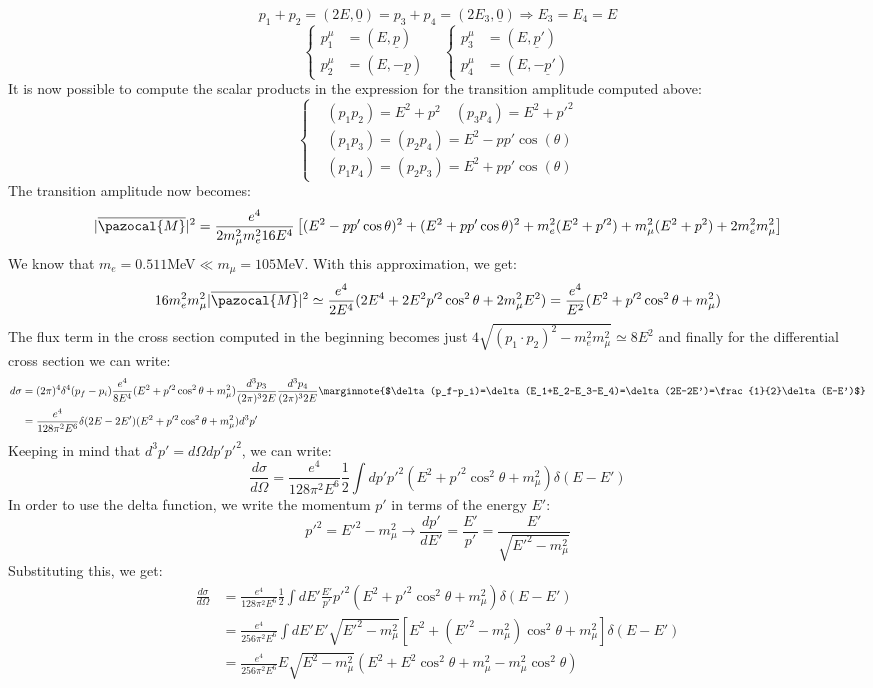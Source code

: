 \documentclass[../main.tex]{subfiles}
\begin{document}
\[
p_1+p_2=(2E,\underline{0})=p_3+p_4=(2E_3,\underline{0})\Rightarrow E_3=E_4=E
\]
\[
\left\{
\begin{aligned}
p_1^\mu&=(E,\underline{p})\\
p_2^\mu&=(E,-\underline{p})
\end{aligned}
\right.
\quad
\left\{
\begin{aligned}
p_3^\mu&=(E,\underline{p}')\\
p_4^\mu&=(E,-\underline{p}')
\end{aligned}
\right.
\]
It is now possible to compute the scalar products in the expression for the transition amplitude computed above:
\[
\left\{
\begin{aligned}
&(p_1p_2)=E^2+p^2 \quad (p_3p_4)=E^2+p'^2\\
&(p_1p_3)=(p_2p_4)=E^2-pp'\cos(\theta)\\
&(p_1p_4)=(p_2p_3)=E^2+pp'\cos(\theta)
\end{aligned}
\right.
\]
The transition amplitude now becomes:
\[
|\overline{\pazocal{M}}|^2=\frac{e^4}{2m_\mu^2m_e^216E^4}\left[(E^2-pp'\cos\theta)^2+(E^2+pp'\cos\theta)^2+m_e^2(E^2+p'^2)+m_\mu^2(E^2+p^2)+2m_e^2m_\mu^2\right]
\]
We know that $m_e=0.511$MeV$\ll m_\mu=105$MeV. With this approximation, we get:
\[
16m_e^2m_\mu^2|\overline{\pazocal{M}}|^2\simeq\frac{e^4}{2E^4}(2E^4+2E^2p'^2\cos^2\theta+2m_\mu^2E^2)=\frac{e^4}{E^2}(E^2+p'^2\cos^2\theta+m_\mu^2)
\]
The flux term in the cross section computed in the beginning becomes just $4\sqrt{(p_1\cdot p_2)^2-m_e^2m_\mu^2}\simeq8E^2$ and finally for the differential cross section we can write:
\begin{align*}
d\sigma&=(2\pi)^4\delta^4(p_f-p_i)\frac{e^4}{8E^4}(E^2+p'^2\cos^2\theta+m_\mu^2)\frac{d^3p_3}{(2\pi)^32E}\frac{d^3p_4}{(2\pi)^32E}\marginnote{$\delta(p_f-p_i)=\delta(E_1+E_2-E_3-E_4)=\delta(2E-2E')=\frac{1}{2}\delta(E-E')$}\\
&=\frac{e^4}{128\pi^2E^6}\delta(2E-2E')(E^2+p'^2\cos^2\theta+m_\mu^2)d^3p'
\end{align*}
Keeping in mind that $d^3p'=d\Omega dp'p'^2$, we can write:
\[
\frac{d\sigma}{d\Omega}=\frac{e^4}{128\pi^2E^6}\frac{1}{2}\int dp'p'^2(E^2+p'^2\cos^2\theta+m_\mu^2)\delta(E-E')
\]
In order to use the delta function, we write the momentum $p'$ in terms of the energy $E'$:
\[
p'^2=E'^2-m_\mu^2\xrightarrow[]{}\frac{dp'}{dE'}=\frac{E'}{p'}=\frac{E'}{\sqrt{E'^2-m_\mu^2}}
\]
Substituting this, we get:
\begin{align*}
\frac{d\sigma}{d\Omega}&=\frac{e^4}{128\pi^2E^6}\frac{1}{2}\int dE'\frac{E'}{p'}p'^2(E^2+p'^2\cos^2\theta+m_\mu^2)\delta(E-E')\\
&=\frac{e^4}{256\pi^2E^6}\int dE'E'\sqrt{E'^2-m_\mu^2}[E^2+(E'^2-m_\mu^2)\cos^2\theta+m_\mu^2]\delta(E-E')\\
&=\frac{e^4}{256\pi^2E^6}E\sqrt{E^2-m_\mu^2}(E^2+E^2\cos^2\theta+m_\mu^2-m_\mu^2\cos^2\theta)
\end{align*}
\end{document}
